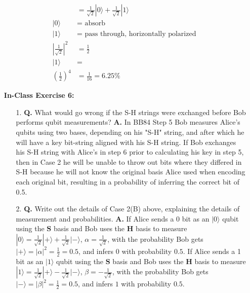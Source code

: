 \documentclass[main.tex]{subfiles}
\begin{document}
\begin{enumerate}
\begin{align*}
                                            & = \frac{1}{\sqrt{2}}|0\rangle+\frac{1}{\sqrt{2}}|1\rangle \tag{device basis}\\
        |0\rangle                           & = \text{ absorb  } \tag{fourth polariser}\\
        |1\rangle                           & = \text{ pass through, horizontally polarized } \tag{fourth polariser}\\
        \left|\frac{1}{\sqrt{2}}\right|^{2} & = \frac{1}{2} \tag {probability of passing through}\\
        |1\rangle                           & = \tag{current state}\\
        \left(\frac{1}{2}\right)^4          & = \frac{1}{16} = 6.25\% \tag{percentage of $|1\rangle$ photons at output}
    \end{align*}

\item[] \textbf{In-Class Exercise 6:}

    \begin{enumerate}
        \item[1.] \textbf{Q.} What would go wrong if the S-H strings were exchanged before Bob performs qubit measurements? \textbf{A.} In BB84 Step 5 Bob measures Alice's qubits using two bases, depending on his "S-H" string, and after which he will have a key bit-string aligned with his S-H string. If Bob exchanges his S-H string with Alice's in step 6 prior to calculating his key in step 5, then in Case 2 he will be unable to throw out bits where they differed in S-H because he will not know the original basis Alice used when encoding each original bit, resulting in a probability of inferring the correct bit of 0.5.
        
        \item[2.] \textbf{Q.} Write out the details of Case 2(B) above, explaining the details of measurement and probabilities. \textbf{A.} If Alice sends a 0 bit as an $|0\rangle$ qubit using the $\mathbf{S}$ basis and Bob uses the $\mathbf{H}$ basis to measure $|0\rangle = \frac{1}{\sqrt{2}}|+\rangle + \frac{1}{\sqrt{2}}|-\rangle$, $\alpha = \frac{1}{\sqrt{2}}$, with the probability Bob gets $|+\rangle = |\alpha|^2 = \frac{1}{2} = 0.5$, and infers $0$ with probability $0.5$. If Alice sends a 1 bit as an $|1\rangle$ qubit using the $\mathbf{S}$ basis and Bob uses the $\mathbf{H}$ basis to measure $|1\rangle = \frac{1}{\sqrt{2}}|+\rangle - \frac{1}{\sqrt{2}}|-\rangle$, $\beta = -\frac{1}{\sqrt{2}}$, with the probability Bob gets $|-\rangle = |\beta|^2 = \frac{1}{2} = 0.5$, and infers $1$ with probability $0.5$. 
    \end{enumerate}


\end{enumerate}
\end{document}
